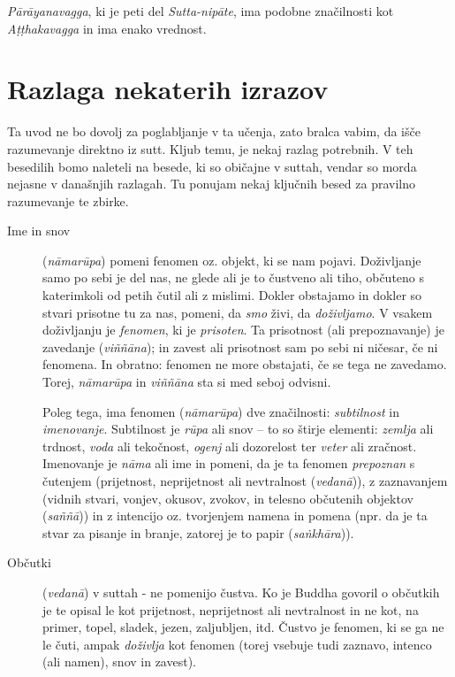 \emph{Pārāyanavagga}, ki je peti del \emph{Sutta-nipāte}, ima podobne
značilnosti kot \emph{Aṭṭhakavagga} in ima enako vrednost.

\chapter{Razlaga nekaterih izrazov}

Ta uvod ne bo dovolj za poglabljanje v ta učenja, zato bralca vabim, da
išče razumevanje direktno iz sutt. Kljub temu, je nekaj razlag
potrebnih. V teh besedilih bomo naleteli na besede, ki so običajne v
suttah, vendar so morda nejasne v današnjih razlagah. Tu ponujam nekaj
ključnih besed za pravilno razumevanje te zbirke.

\begin{description}

\item[Ime in snov] (\emph{nāmarūpa}) pomeni fenomen oz. objekt,
ki se nam pojavi. Doživljanje samo po sebi je del nas, ne glede ali je
to čustveno ali tiho, občuteno s katerimkoli od petih čutil ali z
mislimi. Dokler obstajamo in dokler so stvari prisotne tu za nas,
pomeni, da \emph{smo} živi, da \emph{doživljamo}. V vsakem doživljanju
je \emph{fenomen}, ki je \emph{prisoten}. Ta prisotnost (ali
prepoznavanje) je zavedanje (\emph{viññāna}); in zavest ali prisotnost
sam po sebi ni ničesar, če ni fenomena. In obratno: fenomen ne more
obstajati, če se tega ne zavedamo. Torej, \emph{nāmarūpa} in
\emph{viññāna} sta si med seboj odvisni.

Poleg tega, ima fenomen (\emph{nāmarūpa}) dve značilnosti:
\emph{subtilnost} in \emph{imenovanje}. Subtilnost je \emph{rūpa} ali
snov -- to so štirje elementi: \emph{zemlja} ali trdnost,
\emph{voda} ali tekočnost, \emph{ogenj} ali dozorelost ter \emph{veter}
ali zračnost. Imenovanje je \emph{nāma} ali ime in pomeni, da je ta
fenomen \emph{prepoznan} s čutenjem (prijetnost, neprijetnost ali
nevtralnost (\emph{vedanā})), z zaznavanjem (vidnih stvari, vonjev,
okusov, zvokov, in telesno občutenih objektov (\emph{saññā})) in z
intencijo oz. tvorjenjem namena in pomena (npr. da je ta stvar za
pisanje in branje, zatorej je to papir (\emph{saṅkhāra})).

\item[Občutki] (\emph{vedanā}) v suttah - ne pomenijo čustva. Ko je
Buddha govoril o občutkih je te opisal le kot prijetnost, neprijetnost
ali nevtralnost in ne kot, na primer, topel, sladek, jezen, zaljubljen,
itd. Čustvo je fenomen, ki se ga ne le čuti, ampak \emph{doživlja} kot
fenomen (torej vsebuje tudi zaznavo, intenco (ali namen), snov in
zavest).


\end{description}
